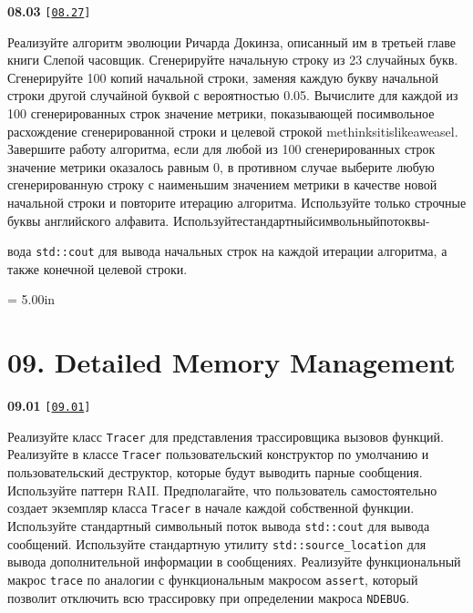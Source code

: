 \documentclass[a4paper,12pt]{article}
\begin{document}
\bigskip

{\large \textbf{08.03} \texttt{[\href{https://github.com/i-s-m-mipt/Education/blob/master/projects/examples/source/08.27.cpp}{\texttt{08.27}}]}}

\bigskip

Реализуйте алгоритм эволюции Ричарда Докинза, описанный им в третьей главе книги Слепой часовщик. Сгенерируйте начальную строку из 23 случайных букв. Сгенерируйте 100 копий начальной строки, заменяя каждую букву начальной строки другой случайной буквой с вероятностью 0.05. Вычислите для каждой из 100 сгенерированных строк значение метрики, показывающей посимвольное расхождение сгенерированной строки и целевой строкой methinksitislikeaweasel. Завершите работу алгоритма, если для любой из 100 сгенерированных строк значение метрики оказалось равным 0, в противном случае выберите любую сгенерированную строку с наименьшим значением метрики в качестве новой начальной строки и повторите итерацию алгоритма. Используйте только строчные буквы английского алфавита. Используйте\;стандартный\;символьный\;поток\;вы- 

вода \lstinline{std::cout} для вывода начальных строк на каждой итерации алгоритма, а также конечной целевой строки.





\newpage\thispagestyle{empty}\pdfpageheight = 5.00in\enlargethispage{100in}

\section{09. Detailed Memory Management}

{\large \textbf{09.01} \texttt{[\href{https://github.com/i-s-m-mipt/Education/blob/master/projects/examples/source/09.01.cpp}{\texttt{09.01}}]}}

\bigskip

Реализуйте класс \lstinline{Tracer} для представления трассировщика вызовов функций. Реализуйте в классе \lstinline{Tracer} пользовательский конструктор по умолчанию и пользовательский деструктор, которые будут выводить парные сообщения. Используйте паттерн RAII. Предполагайте, что пользователь самостоятельно создает экземпляр класса \lstinline{Tracer} в начале каждой собственной функции. Используйте стандартный символьный поток вывода \lstinline{std::cout} для вывода сообщений. Используйте стандартную утилиту \lstinline{std::source_location} для вывода дополнительной информации в сообщениях. Реализуйте функциональный макрос \lstinline{trace} по аналогии с функциональным макросом \lstinline{assert}, который позволит отключить всю трассировку при определении макроса \lstinline{NDEBUG}.
\end{document}
